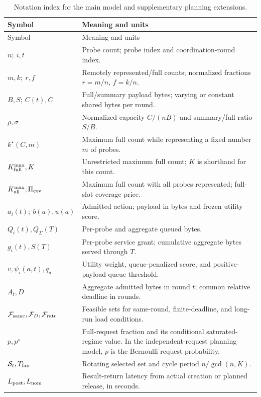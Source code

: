 \documentclass[10pt,onecolumn]{IEEEtran}
\begin{document}
{\small
\begin{longtable}{@{}p{}p{}@{}}
\caption{Notation index for the main model and supplementary planning extensions.}
\label{tab:supp_notation}\\
\toprule Symbol & Meaning and units \\
\midrule
\endfirsthead
\toprule Symbol & Meaning and units \\
\midrule
\endhead
\bottomrule
\endfoot
$n;\ i,t$ & Probe count; probe index and coordination-round index. \\
$m,k;\ r,f$ & Remotely represented/full counts; normalized fractions $r=m/n$, $f=k/n$. \\
$B,S;\ C(t),C$ & Full/summary payload bytes; varying or constant shared bytes per round. \\
$\rho,\sigma$ & Normalized capacity $C/(nB)$ and summary/full ratio $S/B$. \\
$k^\star(C,m)$ & Maximum full count while representing a fixed number $m$ of probes. \\
$K_{\rm full}^{\max},K$ & Unrestricted maximum full count; $K$ is shorthand for this count. \\
$K_{\rm all}^{\max},\Pi_{\rm cov}$ & Maximum full count with all probes represented; full-slot coverage price. \\
$a_i(t);\ b(a),u(a)$ & Admitted action; payload in bytes and frozen utility score. \\
$Q_i(t),Q_\Sigma(T)$ & Per-probe and aggregate queued bytes. \\
$g_i(t),S(T)$ & Per-probe service grant; cumulative aggregate bytes served through $T$. \\
$v,\psi_i(a,t),q_a$ & Utility weight, queue-penalized score, and positive-payload queue threshold. \\
$A_t,D$ & Aggregate admitted bytes in round $t$; common relative deadline in rounds. \\
$\mathcal F_{\rm same},\mathcal F_D,\mathcal F_{\rm rate}$ & Feasible sets for same-round, finite-deadline, and long-run load conditions. \\
$p,p^\star$ & Full-request fraction and its conditional saturated-regime value. In the independent-request planning model, $p$ is the Bernoulli request probability. \\
$\mathcal S_t,T_{\rm fair}$ & Rotating selected set and cycle period $n/\gcd(n,K)$. \\
$L_{\rm post},L_{\rm nom}$ & Result-return latency from actual creation or planned release, in seconds. \\

\end{longtable}}
\end{document}
